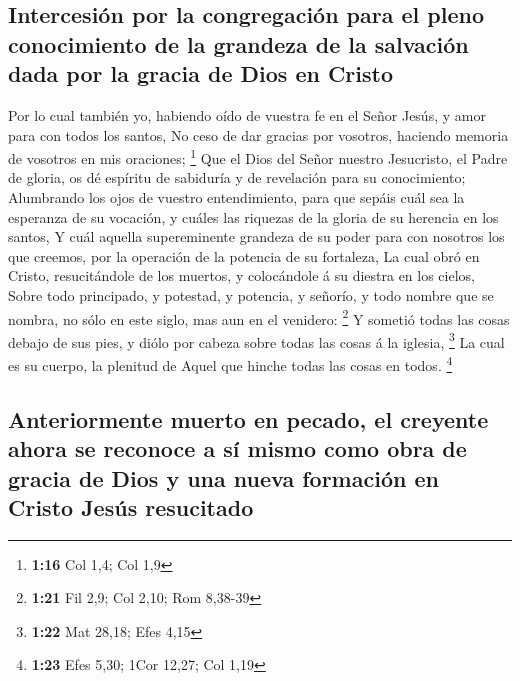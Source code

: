 \hypertarget{intercesiuxf3n-por-la-congregaciuxf3n-para-el-pleno-conocimiento-de-la-grandeza-de-la-salvaciuxf3n-dada-por-la-gracia-de-dios-en-cristo}{%
\subsection{Intercesión por la congregación para el pleno conocimiento
de la grandeza de la salvación dada por la gracia de Dios en
Cristo}\label{intercesiuxf3n-por-la-congregaciuxf3n-para-el-pleno-conocimiento-de-la-grandeza-de-la-salvaciuxf3n-dada-por-la-gracia-de-dios-en-cristo}}

 Por lo cual también yo, habiendo oído de vuestra fe en el
Señor Jesús, y amor para con todos los santos,  No ceso de
dar gracias por vosotros, haciendo memoria de vosotros en mis oraciones;
\footnote{\textbf{1:16} Col 1,4; Col 1,9}  Que el Dios del
Señor nuestro Jesucristo, el Padre de gloria, os dé espíritu de
sabiduría y de revelación para su conocimiento;  Alumbrando
los ojos de vuestro entendimiento, para que sepáis cuál sea la esperanza
de su vocación, y cuáles las riquezas de la gloria de su herencia en los
santos,  Y cuál aquella supereminente grandeza de su poder
para con nosotros los que creemos, por la operación de la potencia de su
fortaleza,  La cual obró en Cristo, resucitándole de los
muertos, y colocándole á su diestra en los cielos,  Sobre
todo principado, y potestad, y potencia, y señorío, y todo nombre que se
nombra, no sólo en este siglo, mas aun en el venidero: \footnote{\textbf{1:21}
  Fil 2,9; Col 2,10; Rom 8,38-39}  Y sometió todas las
cosas debajo de sus pies, y diólo por cabeza sobre todas las cosas á la
iglesia, \footnote{\textbf{1:22} Mat 28,18; Efes 4,15}  La
cual es su cuerpo, la plenitud de Aquel que hinche todas las cosas en
todos. \footnote{\textbf{1:23} Efes 5,30; 1Cor 12,27; Col 1,19}

\hypertarget{anteriormente-muerto-en-pecado-el-creyente-ahora-se-reconoce-a-suxed-mismo-como-obra-de-gracia-de-dios-y-una-nueva-formaciuxf3n-en-cristo-jesuxfas-resucitado}{%
\subsection{Anteriormente muerto en pecado, el creyente ahora se
reconoce a sí mismo como obra de gracia de Dios y una nueva formación en
Cristo Jesús
resucitado}\label{anteriormente-muerto-en-pecado-el-creyente-ahora-se-reconoce-a-suxed-mismo-como-obra-de-gracia-de-dios-y-una-nueva-formaciuxf3n-en-cristo-jesuxfas-resucitado}}

